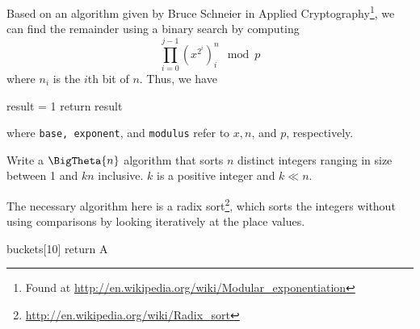 \documentclass[12pt,letterpaper]{hmcpset}
\begin{document}
\begin{solution}
Based on an algorithm given by Bruce Schneier in Applied Cryptography\footnote{Found at \url{http://en.wikipedia.org/wiki/Modular_exponentiation}}, we can find the remainder using a binary search by computing \[ \prod\limits_{i=0}^{j-1} \left(x^{2^i}\right)^n_i \mod{p}\] where $n_i$ is the $i$th bit of $n$.  Thus, we have

\begin{algorithm}[H]
\SetAlgoLined
result = 1\;
return result
\end{algorithm}
where \texttt{base, exponent}, and \texttt{modulus} refer to $x, n$, and $p$, respectively.
\end{solution}

\begin{problem}
Write a $\BigTheta{n}$ algorithm that sorts $n$ distinct integers ranging in size between 1 and $kn$ inclusive.  $k$ is a positive integer and $k \ll n$.
\end{problem}


\begin{solution}
The necessary algorithm here is a radix sort\footnote{\url{http://en.wikipedia.org/wiki/Radix_sort}}, which sorts the integers without using comparisons by looking iteratively at the place values.

\begin{algorithm}[H]
\SetAlgoLined
{}
buckets[10]\;
return A\;
\end{algorithm}

\end{solution}
\end{document}
